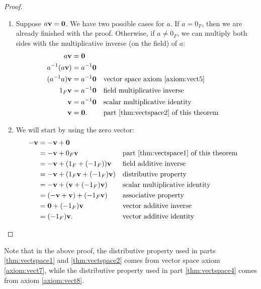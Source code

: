 \begin{proof}
\begin{enumerate}
    \item Suppose $ a\boldsymbol{\mathbf{v}}=\boldsymbol{\mathbf{0}} $. We have two possible cases for $ a $. If $ a=0_F $, then we are already finished with the proof. Otherwise, if $ a\neq 0_F $, we can multiply both sides with the multiplicative inverse (on the field) of $ a $:
    \begin{align*}
        a\boldsymbol{\mathbf{v}} &= \boldsymbol{\mathbf{0}} \\
        a^{-1}(a\boldsymbol{\mathbf{v}}) &= a^{-1}\boldsymbol{\mathbf{0}} \\
        (a^{-1}a)\boldsymbol{\mathbf{v}} &= a^{-1}\boldsymbol{\mathbf{0}} && \text{vector space axiom \ref{axiom:vect5}} \\
        1_F\boldsymbol{\mathbf{v}} &= a^{-1}\boldsymbol{\mathbf{0}} && \text{field multiplicative inverse} \\
        \boldsymbol{\mathbf{v}} &= a^{-1}\boldsymbol{\mathbf{0}} && \text{scalar multiplicative identity} \\
        \boldsymbol{\mathbf{v}} &= \boldsymbol{\mathbf{0}}. && \text{part \ref{thm:vectspace2} of this theorem}
    \end{align*}

    \item We will start by using the zero vector:
    \begin{align*}
        -\boldsymbol{\mathbf{v}} &= -\boldsymbol{\mathbf{v}}+\boldsymbol{\mathbf{0}} \\
        &= -\boldsymbol{\mathbf{v}}+0_F\boldsymbol{\mathbf{v}} && \text{part \ref{thm:vectspace1} of this theorem} \\
        &= -\boldsymbol{\mathbf{v}}+(1_F+(-1_F))\boldsymbol{\mathbf{v}} && \text{field additive inverse} \\
        &= -\boldsymbol{\mathbf{v}}+(1_F\boldsymbol{\mathbf{v}}+(-1_F)\boldsymbol{\mathbf{v}}) && \text{distributive property} \\
        &= -\boldsymbol{\mathbf{v}}+(\boldsymbol{\mathbf{v}}+(-1_F)\boldsymbol{\mathbf{v}}) && \text{scalar multiplicative identity} \\
        &= (-\boldsymbol{\mathbf{v}}+\boldsymbol{\mathbf{v}})+(-1_F\boldsymbol{\mathbf{v}}) && \text{associative property} \\
        &= \boldsymbol{\mathbf{0}}+(-1_F)\boldsymbol{\mathbf{v}} && \text{vector additive inverse} \\
        &= (-1_F)\boldsymbol{\mathbf{v}}. && \text{vector additive identity} \qedhere
    \end{align*}
\end{enumerate}
\end{proof}

Note that in the above proof, the distributive property used in parts \ref{thm:vectspace1} and \ref{thm:vectspace2} comes from vector space axiom \ref{axiom:vect7}, while the distributive property used in part \ref{thm:vectspace4} comes from axiom \ref{axiom:vect8}.

